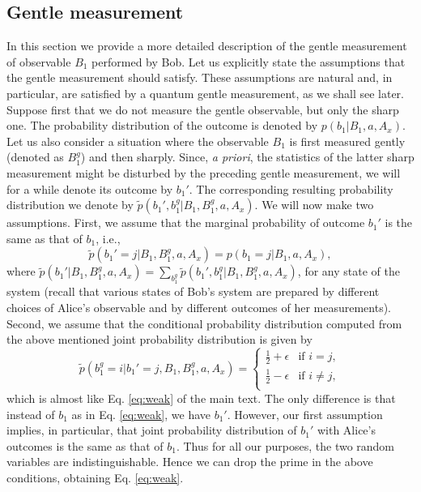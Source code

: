 \documentclass[pra,twocolumn,showpacs,preprintnumbers,amsmath,amssymb,superscriptaddress]{revtex4-1}
\def\be{\begin{equation}}
\def\ee{\end{equation}}
\def\mt{main text\xspace}
\def\omeas{B_1}
\def\ogentle{B_1^g}
\begin{document}
	
		
		
		
		
		
		
		
		
\onecolumngrid
		
		
		
		

\begin{appendix}
\section{Gentle measurement}\label{secGENTLE}

In this section we provide a more detailed description of the gentle measurement of observable $\omeas$ performed by Bob.
Let us explicitly state the assumptions that the gentle measurement should satisfy. These assumptions are natural and, in particular, are satisfied by a quantum gentle measurement, as we shall see later. Suppose first that we do not measure the gentle observable, but only the sharp one.
The probability distribution of the outcome is denoted by $p(b_1|\omeas,a,A_x)$. Let us also consider a situation where the observable $\omeas$ is first measured gently (denoted as $\ogentle$) and then sharply.
Since, {\it a priori}, the statistics of the latter sharp measurement might be
disturbed by the preceding gentle measurement, we will for a while denote its outcome by $b_1'$. The corresponding resulting probability distribution we denote by $\tilde p(b_1',b_1^g|\omeas,\ogentle,a,A_x)$.
We will now make two assumptions. First, we assume that the marginal probability of outcome $b_1'$ is the same as  that of $b_1$, i.e.,
\be
\tilde p(b_1'=j|\omeas,\ogentle,a,A_x)=p(b_1=j|\omeas,a,A_x),
\ee
where $\tilde p(b_1'|\omeas,\ogentle,a,A_x)=\sum_{b_1^g} \tilde p(b_1',b_1^g|\omeas,\ogentle,a,A_x)$, for any state of the system (recall that various states of Bob's system are prepared by
different choices of Alice's observable  and by different outcomes of her measurements).
Second, we assume that the conditional probability distribution computed from the above mentioned joint probability distribution is given by
\be
\label{gentle_sm}
\tilde p(b_1^{g}=i|b_1'=j,\omeas,\ogentle,a,A_x)=
  \begin{cases}
   \tfrac12+\epsilon & \text{if } i=j,  \\
   \tfrac12-\epsilon & \text{if } i\neq j, \\
  \end{cases}
\ee
which is almost like Eq. \eqref{eq:weak} of the \mt. The only difference is that instead of $b_1$ as in Eq. \eqref{eq:weak},
we have $b_1'$. However, our first assumption implies, in particular, that joint probability distribution  of $b_1'$
with Alice's outcomes is the same as that of $b_1$. Thus for all our purposes, the two random variables are indistinguishable.
Hence we can drop the prime in the above conditions, obtaining Eq. \eqref{eq:weak}.\\



\end{appendix}
\end{document}
